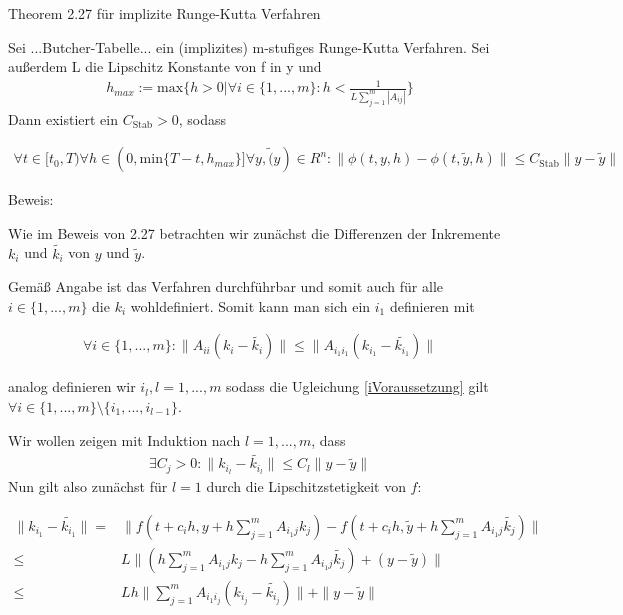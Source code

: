 \begin{solution}
Theorem 2.27 für implizite Runge-Kutta Verfahren

Sei ...Butcher-Tabelle... ein (implizites) m-stufiges Runge-Kutta Verfahren. Sei außerdem L die Lipschitz Konstante von f in y und
\begin{align*}
  h_{max} := \text{max}\{h>0|\forall i \in \{1,...,m\}:h<\frac{1}{L\sum_{j=1}^{m}|A_{ij}|}\}
\end{align*}
Dann existiert ein $C_{\text{Stab}} > 0$, sodass

\begin{align*}
  \forall t \in [t_{0},T) \forall h \in (0,\text{min}\{T-t,h_{max}\}] \forall y, \tilde(y) \in R^{n} : \|\phi(t,y,h) - \phi(t,\tilde{y},h)\| \leq C_{\text{Stab}} \|y-\tilde{y}\|
\end{align*}

Beweis:

Wie im Beweis von 2.27 betrachten wir zunächst die Differenzen der Inkremente $k_{i}$ und $\tilde{k_{i}}$ von $y$ und $\tilde{y}$.

Gemäß Angabe ist das Verfahren durchführbar und somit auch für alle $i \in \{1,...,m\}$ die $k_{i}$ wohldefiniert.
Somit kann man sich ein $i_{1}$ definieren mit

\begin{align}\label{iVoraussetzung}
  \forall i\in \{1,...,m\}:\|A_{ii}(k_{i}-\tilde{k_{i}})\| \leq \|A_{i_{1}i_{1}}(k_{i_{1}}-\tilde{k_{i_{1}}})\|
\end{align}

analog definieren wir $i_{l}, l=1,...,m$ sodass die Ugleichung \eqref{iVoraussetzung} gilt $\forall i\in \{1,...,m\}\setminus \{i_{1},...,i_{l-1}\}$.

Wir wollen zeigen mit Induktion nach $l=1,...,m$, dass
\begin{align}\label{ind}
  \exists C_{j}>0: \|k_{i_{l}}-\tilde{k_{i_{l}}}\| \leq C_{l} \|y-\tilde{y}\|
\end{align}
Nun gilt also zunächst für $l=1$ durch die Lipschitzstetigkeit von $f$:

\begin{align*}
  \|k_{i_{1}}-\tilde{k_{i_{1}}}\| =& \|f(t+c_{i}h,y+h\sum_{j=1}^{m}A_{i_{1}j}k_{j})-f(t+c_{i}h,\tilde{y}+h\sum_{j=1}^{m}A_{i_{1}j}\tilde{k_{j}})\| \\
  \leq& L\|(h\sum_{j=1}^{m}A_{i_{1}j}k_{j}-h\sum_{j=1}^{m}A_{i_{1}j}\tilde{k_{j}}) + (y-\tilde{y})\| \\
  \leq& Lh \|\sum_{j=1}^{m}A_{i_{1}i_{j}}(k_{i_{j}}-\tilde{k_{i_{j}}})\| + \|y-\tilde{y}\|
\end{align*}


\end{solution}
